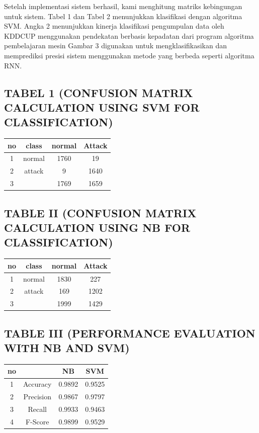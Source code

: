 \documentclass[conference]{IEEEtran}
\begin{document}
Setelah implementasi sistem berhasil, kami menghitung matriks kebingungan untuk sistem. Tabel 1 dan Tabel 2 menunjukkan klasifikasi dengan algoritma SVM. Angka
2 menunjukkan kinerja klasifikasi pengumpulan data oleh KDDCUP menggunakan pendekatan berbasis kepadatan dari program algoritma pembelajaran mesin Gambar 3 digunakan untuk mengklasifikasikan dan memprediksi presisi sistem menggunakan
metode yang berbeda seperti algoritma RNN.

\subsection{TABEL 1 (CONFUSION MATRIX CALCULATION USING SVM FOR CLASSIFICATION)}

\begin{table}[H]
\begin{tabular}{|c|c|c|c|}
\hline
no & class & normal & Attack\\
\hline
1   & normal & 1760 & 19\\
\hline
2   & attack & 9 & 1640\\
\hline
3   &  & 1769 & 1659 \\
\hline
\end{tabular}
\end{table}

\subsection{TABLE II (CONFUSION MATRIX CALCULATION USING NB FOR CLASSIFICATION)}

\begin{table}[H]
\begin{tabular}{|c|c|c|c|}
\hline
no & class & normal & Attack\\
\hline
1   & normal & 1830 & 227\\
\hline
2   & attack & 169 & 1202\\
\hline
3   &  & 1999 & 1429 \\
\hline
\end{tabular}
\end{table}

\subsection{TABLE III (PERFORMANCE EVALUATION WITH NB AND SVM)}

\begin{table}[H]
\begin{tabular}{|c|c|c|c|}
\hline
no &  & NB & SVM\\
\hline
1   & Accuracy & 0.9892 & 0.9525\\
\hline
2   & Precision & 0.9867 & 0.9797\\
\hline
3   & Recall & 0.9933 & 0.9463 \\
\hline
4   & F-Score& 0.9899 & 0.9529 \\
\hline
\end{tabular}
\end{table}
\end{document}
